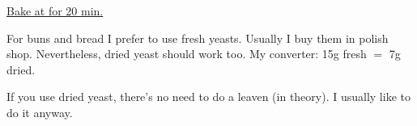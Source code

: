 \begin{recipe}
{        \step \underline{Bake at \unit[180]{\textcelcius} for 20 min.}
        \vspace{2cm}
    }

    \suggestion
    {%
        For buns and bread I prefer to use fresh yeasts.
        Usually I buy them in polish shop.
        Nevertheless, dried yeast should work too.
        My converter: 15g fresh $=$ 7g dried.

        If you use dried yeast, there's no need to do a leaven (in theory).
        I usually like to do it anyway.
    }


\end{recipe}
